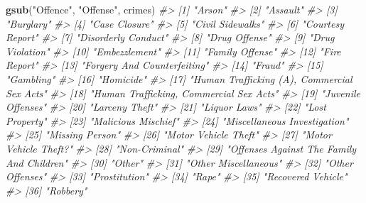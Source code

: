 \documentclass[
  12pt,
]{book}
\newenvironment{Shaded}{\begin{snugshade}}{\end{snugshade}}
\newcommand{\CommentTok}[1]{\textcolor[rgb]{0.56,0.35,0.01}{\textit{#1}}}
\newcommand{\KeywordTok}[1]{\textcolor[rgb]{0.13,0.29,0.53}{\textbf{#1}}}
\newcommand{\NormalTok}[1]{#1}
\newcommand{\StringTok}[1]{\textcolor[rgb]{0.31,0.60,0.02}{#1}}
\begin{document}
\begin{Shaded}
\begin{Highlighting}[]
\KeywordTok{gsub}\NormalTok{(}\StringTok{"Offence"}\NormalTok{, }\StringTok{"Offense"}\NormalTok{, crimes)}
\CommentTok{\#>  [1] "Arson"                                     }
\CommentTok{\#>  [2] "Assault"                                   }
\CommentTok{\#>  [3] "Burglary"                                  }
\CommentTok{\#>  [4] "Case Closure"                              }
\CommentTok{\#>  [5] "Civil Sidewalks"                           }
\CommentTok{\#>  [6] "Courtesy Report"                           }
\CommentTok{\#>  [7] "Disorderly Conduct"                        }
\CommentTok{\#>  [8] "Drug Offense"                              }
\CommentTok{\#>  [9] "Drug Violation"                            }
\CommentTok{\#> [10] "Embezzlement"                              }
\CommentTok{\#> [11] "Family Offense"                            }
\CommentTok{\#> [12] "Fire Report"                               }
\CommentTok{\#> [13] "Forgery And Counterfeiting"                }
\CommentTok{\#> [14] "Fraud"                                     }
\CommentTok{\#> [15] "Gambling"                                  }
\CommentTok{\#> [16] "Homicide"                                  }
\CommentTok{\#> [17] "Human Trafficking (A), Commercial Sex Acts"}
\CommentTok{\#> [18] "Human Trafficking, Commercial Sex Acts"    }
\CommentTok{\#> [19] "Juvenile Offenses"                         }
\CommentTok{\#> [20] "Larceny Theft"                             }
\CommentTok{\#> [21] "Liquor Laws"                               }
\CommentTok{\#> [22] "Lost Property"                             }
\CommentTok{\#> [23] "Malicious Mischief"                        }
\CommentTok{\#> [24] "Miscellaneous Investigation"               }
\CommentTok{\#> [25] "Missing Person"                            }
\CommentTok{\#> [26] "Motor Vehicle Theft"                       }
\CommentTok{\#> [27] "Motor Vehicle Theft?"                      }
\CommentTok{\#> [28] "Non{-}Criminal"                              }
\CommentTok{\#> [29] "Offenses Against The Family And Children"  }
\CommentTok{\#> [30] "Other"                                     }
\CommentTok{\#> [31] "Other Miscellaneous"                       }
\CommentTok{\#> [32] "Other Offenses"                            }
\CommentTok{\#> [33] "Prostitution"                              }
\CommentTok{\#> [34] "Rape"                                      }
\CommentTok{\#> [35] "Recovered Vehicle"                         }
\CommentTok{\#> [36] "Robbery"                                   }

\end{Highlighting}
\end{Shaded}
\end{document}
